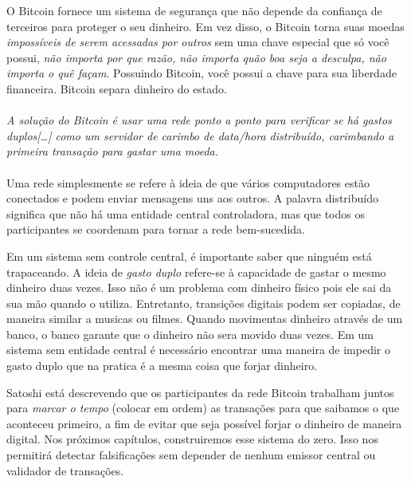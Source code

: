 O Bitcoin fornece um sistema de segurança que não depende da confiança de terceiros para proteger o seu dinheiro. Em vez disso, o Bitcoin torna suas moedas \textit{impossíveis de serem acessadas por outros} sem uma chave especial que só você possui, \textit{não importa por que razão, não importa quão boa seja a desculpa, não importa o quê façam}. Possuindo Bitcoin, você possui a chave para sua liberdade financeira. Bitcoin separa dinheiro do estado.

\paragraph{}
\textit{A solução do Bitcoin é usar uma rede ponto a ponto para verificar se há gastos duplos[\ldots] como um servidor de carimbo de data/hora distribuído, carimbando a primeira transação para gastar uma moeda.}
\paragraph{}
Uma rede simplesmente se refere à ideia de que vários computadores estão conectados e podem enviar mensagens uns aos outros. A palavra distribuído significa que não há uma entidade central controladora, mas que todos os participantes se coordenam para tornar a rede bem-sucedida.

Em um sistema sem controle central, é importante saber que ninguém está trapaceando. A ideia de \textit{gasto duplo} refere-se à capacidade de gastar o mesmo dinheiro duas vezes. Isso não é um problema com dinheiro físico pois ele sai da sua mão quando o utiliza. Entretanto, transições digitais podem ser copiadas, de maneira similar a musicas ou filmes. Quando movimentas dinheiro através de um banco, o banco garante que o dinheiro não sera movido duas vezes. Em um sistema sem entidade central é necessário encontrar uma maneira de impedir o gasto duplo que na pratica é a mesma coisa que forjar dinheiro.

Satoshi está descrevendo que os participantes da rede Bitcoin trabalham juntos para \textit{marcar o tempo} (colocar em ordem) as transações para que saibamos o que aconteceu primeiro, a fim de evitar que seja possível forjar o dinheiro de maneira digital. Nos próximos capítulos, construiremos esse sistema do zero. Isso nos permitirá detectar falsificações sem depender de nenhum emissor central ou validador de transações.

